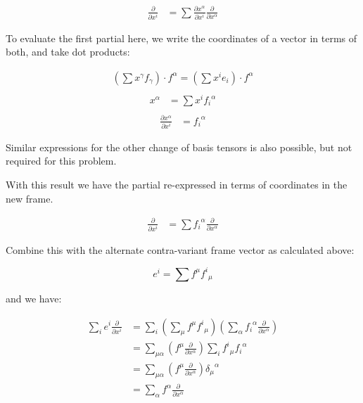\begin{align*}
\frac{\partial}{\partial x^i} &= \sum \frac{\partial x^\alpha}{\partial x^i} \frac{\partial}{\partial x^\alpha} 
\end{align*}

To evaluate the first partial here, we write the coordinates of a vector in terms of both, and take dot products:

\begin{align*}
\left(\sum x^{\gamma} f_{\gamma}\right) \cdot f^{\alpha} = \left(\sum x^i e_i\right) \cdot f^{\alpha} \\
\end{align*}
\begin{align*}
x^{\alpha} &= \sum x^i {f_i}^{\alpha} \\
\end{align*}
\begin{align*}
\frac{\partial x^{\alpha}}{\partial x^i} &= {f_i}^{\alpha}
\end{align*}

Similar expressions for the other change of basis tensors is also possible, but
not required for this problem.

With this result we have the partial re-expressed in terms of coordinates
in the new frame.

\begin{align*}
\frac{\partial}{\partial x^i} &= \sum {f_i}^{\alpha} \frac{\partial}{\partial x^\alpha} 
\end{align*}

Combine this with the alternate contra-variant frame vector as calculated above:

\[
e^i = \sum f^{\mu} {f^i}_{\mu}
\]

and we have:

\begin{align*}
\sum_i e^i \frac{\partial}{\partial x^i}
&= \sum_i \left(\sum_{\mu} f^{\mu} {f^i}_{\mu} \right) \left( \sum_{\alpha} {f_i}^{\alpha} \frac{\partial}{\partial x^\alpha}\right) \\
&= \sum_{\mu \alpha} \left(f^{\mu} \frac{\partial}{\partial x^\alpha} \right) \sum_i {f^i}_{\mu} {f_i}^{\alpha} \\
&= \sum_{\mu \alpha} \left(f^{\mu} \frac{\partial}{\partial x^\alpha} \right) {\delta_{\mu}}^{\alpha} \\
&= \sum_{\alpha} f^{\alpha} \frac{\partial}{\partial x^\alpha} \\
\end{align*}

